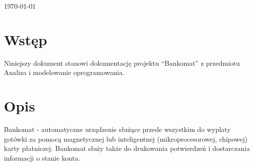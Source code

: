 \documentclass[a4paper, 11pt]{article}
\begin{document}
\begin{titlepage}
		
		
		{\large \today}\\[3cm] %
		
		
		
		
		\vfill %
		
	\end{titlepage}
	
	
	\tableofcontents
	\vfill
	\newpage	%
	
	
	
	\section{Wstęp}
	\indent
	
	Niniejszy dokument stanowi dokumentację projektu ``Bankomat'' z przedmiotu Analiza i modelowanie oprogramowania.
	
	\section{Opis}
		\indent
		
	Bankomat - automatyczne urządzenie służące przede wszystkim do wyplaty gotówki za pomocą magnetycznej lub inteligentnej (mikroprocesorowej, chipowej) karty płatniczej. Bankomat służy także do drukowania potwierdzeń i dostarczania informacji o stanie konta.
	
\end{document}
